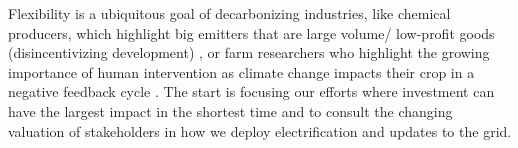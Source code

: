 Flexibility is a ubiquitous goal of decarbonizing industries, like
chemical producers, which highlight big emitters that are large volume/
low-profit goods (disincentivizing development)
\cite{mallapragada_decarbonization_2023}, or farm researchers who highlight the
growing importance of human intervention as climate change impacts their crop
in a negative feedback cycle \cite{farokhi_soofi_farm_2022}. The start is
focusing our efforts where investment can have the largest impact in the
shortest time and to consult the changing valuation of stakeholders in how we
deploy electrification and updates to the grid.